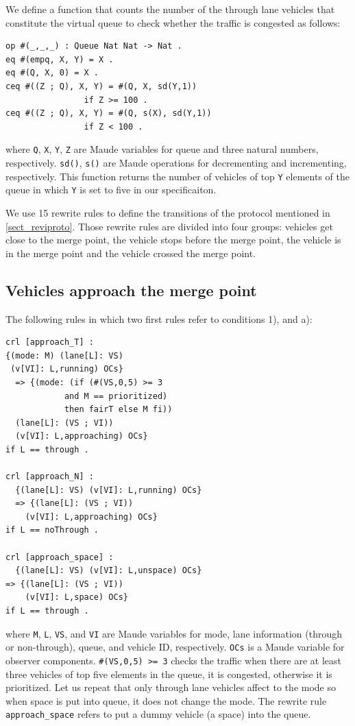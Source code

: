 \documentclass[10pt, conference, compsocconf]{IEEEtran}
\begin{document}
We define a function that counts the number of the through lane
vehicles that constitute the virtual queue to check whether the 
traffic is congested as follows:
\begin{small}
\begin{verbatim}
op #(_,_,_) : Queue Nat Nat -> Nat .
eq #(empq, X, Y) = X .
eq #(Q, X, 0) = X .
ceq #((Z ; Q), X, Y) = #(Q, X, sd(Y,1)) 
                if Z >= 100 .
ceq #((Z ; Q), X, Y) = #(Q, s(X), sd(Y,1)) 
                if Z < 100 .
\end{verbatim}
\end{small}
\noindent where \verb!Q!, \verb!X!, \verb!Y!, \verb!Z! are Maude variables 
for queue and three natural numbers, respectively. \verb!sd()!, \verb!s()! are 
Maude operations for decrementing and incrementing, respectively.
This function returns the number of vehicles of top \verb!Y! elements of the queue
in which \verb!Y! is set to five in our specificaiton. 
 
We use 15 rewrite rules to define the transitions of the protocol mentioned in \ref{sect_reviproto}.
Those rewrite rules are divided into four groups: vehicles get close to the merge point,
the vehicle stops before the merge point, the vehicle is in the merge point and 
the vehicle crossed the merge point.

\subsection{Vehicles approach the merge point}
The following rules in which two first rules refer to conditions 1), and a):
\begin{small}
  \begin{verbatim}
crl [approach_T] : 
{(mode: M) (lane[L]: VS) 
 (v[VI]: L,running) OCs} 
  => {(mode: (if (#(VS,0,5) >= 3 
            and M == prioritized) 
            then fairT else M fi))
  (lane[L]: (VS ; VI)) 
  (v[VI]: L,approaching) OCs} 
if L == through .

crl [approach_N] : 
  {(lane[L]: VS) (v[VI]: L,running) OCs} 
  => {(lane[L]: (VS ; VI)) 
    (v[VI]: L,approaching) OCs} 
if L == noThrough .

crl [approach_space] : 
  {(lane[L]: VS) (v[VI]: L,unspace) OCs} 
=> {(lane[L]: (VS ; VI)) 
    (v[VI]: L,space) OCs} 
if L == through .
  \end{verbatim}
\end{small}

\noindent where \verb!M!, \verb!L!, \verb!VS!, and \verb!VI! 
are Maude variables for mode, lane information (through or non-through), queue, and vehicle ID, respectively.
\verb!OCs! is a Maude variable for observer components.
\verb!#(VS,0,5) >= 3! checks the traffic when there are at least three
vehicles of top five elements in the queue, it is congested, otherwise 
it is prioritized. Let us repeat that only through lane vehicles affect
to the mode so when space is put into queue, it does not change the mode.
The rewrite rule \verb!approach_space! refers to put a dummy vehicle (a space) into the queue.
\end{document}

